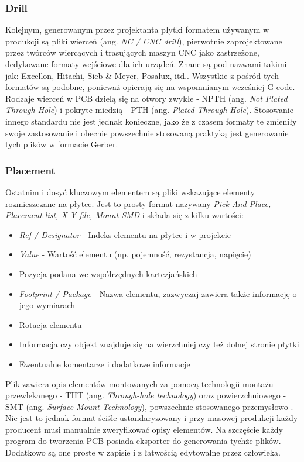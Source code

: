 \documentclass[brudnopis]{xmgr}
\begin{document}
\subsubsection {Drill}
Kolejnym, generowanym przez projektanta płytki formatem używanym w produkcji są pliki wierceń (ang. \emph{NC / CNC drill}), pierwotnie zaprojektowane przez twórców wiercących i trasujących maszyn CNC jako zastrzeżone, dedykowane formaty wejściowe dla ich urządeń. Znane są pod nazwami takimi jak: Excellon, Hitachi, Sieb \& Meyer, Posalux, itd.\cite{Charras}. Wszystkie z pośród tych formatów są podobne, ponieważ opierają się na wspomnianym wcześniej G-code. Rodzaje wierceń w PCB dzielą się na otwory zwykłe - NPTH (ang. \emph{Not Plated Through Hole}) i pokryte miedzią - PTH (ang. \emph{Plated Through Hole})\cite{voldman}. Stosowanie innego standardu nie jest jednak konieczne, jako że z czasem formaty te zmieniły swoje zastosowanie i obecnie powszechnie stosowaną praktyką jest generowanie tych plików w formacie Gerber.

\subsubsection {Placement}
Ostatnim i dosyć kluczowym elementem są pliki wskazujące elementy rozmieszczane na płytce. Jest to prosty format nazywany \emph {Pick-And-Place, Placement list, X-Y file, Mount SMD}  i składa się z kilku wartości:
\begin{itemize}
\item \emph{Ref / Designator} - Indeks elementu na płytce i w projekcie
\item \emph{Value} - Wartość elementu (np. pojemność, rezystancja, napięcie)
\item Pozycja podana we współrzędnych kartezjańskich
\item \emph{Footprint / Package} - Nazwa elementu, zazwyczaj zawiera także informację o jego wymiarach
\item Rotacja elementu
\item Informacja czy objekt znajduje się na wierzchniej czy też dolnej stronie płytki
\item Ewentualne komentarze i dodatkowe informacje
\end{itemize}
Plik zawiera opis elementów montowanych za pomocą technologii montażu przewlekanego - THT (ang. \emph{Through-hole technology}) oraz powierzchniowego - SMT (ang. \emph{Surface Mount Technology}), powszechnie stosowanego przemysłowo \cite {prasad}. Nie jest to jednak format ściśle ustandaryzowany i przy masowej produkcji każdy producent musi manualnie zweryfikować opisy elementów. Na szczęście każdy program do tworzenia PCB posiada eksporter do generowania tychże plików. Dodatkowo są one proste w zapisie i z łatwością edytowalne przez człowieka.
\end{document}
